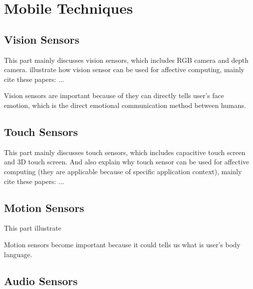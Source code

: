 \section{Mobile Techniques}
\label{sec:mobile}

\subsection{Vision Sensors}
\label{subsec:vision}
This part mainly discusses vision sensors, which includes RGB camera and depth camera.
illustrate how vision sensor can be used for affective computing, mainly cite these papers: ...

Vision sensors are important because of they can directly tells user's face emotion, which is
the direct emotional communication method between humans.

\subsection{Touch Sensors}
\label{subsec:touch}
\cite{Gao2012, Shah2015, Hertenstein2009, bhattacharya2017predictive}
This part mainly discusses touch sensors, which includes capacitive touch screen and 3D touch screen.
And also explain why touch sensor can be used for affective computing (they are applicable
because of specific application context), mainly cite these papers: ...

\subsection{Motion Sensors}
\label{subsec:motion}
This part illustrate \cite{Rana, Mottelson2016, Bailenson2007}

Motion sensors become important because it could tells us what is user's body language.

\subsection{Audio Sensors}
\label{subsec:audio}

